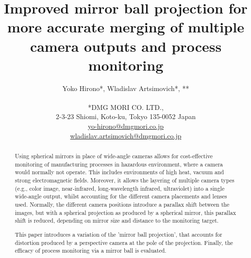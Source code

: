 \documentclass[10pt]{article}
\begin{document}
\title{Improved mirror ball projection for more accurate merging of multiple camera outputs and process monitoring}

\author{Yoko Hirono*, Wladislav Artsimovich*, ** \\
	\\
	*DMG MORI CO. LTD.,\\
	2-3-23 Shiomi, Koto-ku, Tokyo 135-0052 Japan\\
	\href{mailto:wladislav.artsimovich@dmgmori.co.jp}{yo-hirono@dmgmori.co.jp}  \\
	\href{mailto:wladislav.artsimovich@dmgmori.co.jp}{wladislav.artsimovich@dmgmori.co.jp}  \\
}

\maketitle

\begin{abstract}
	Using spherical mirrors in place of wide-angle cameras allows for cost-effective monitoring of manufacturing processes in hazardous environment, where a camera would normally not operate. This includes environments of high heat, vacuum and strong electromagnetic fields. Moreover, it allows the layering of multiple camera types (e.g., color image, near-infrared, long-wavelength infrared, ultraviolet) into a single wide-angle output, whilst accounting for the different camera placements and lenses used. Normally, the different camera positions introduce a parallax shift between the images, but with a spherical projection as produced by a spherical mirror, this parallax shift is reduced, depending on mirror size and distance to the monitoring target.

	This paper introduces a variation of the 'mirror ball projection', that accounts for distortion produced by a perspective camera at the pole of the projection. Finally, the efficacy of process monitoring via a mirror ball is evaluated.
\end{abstract}

\end{document}
